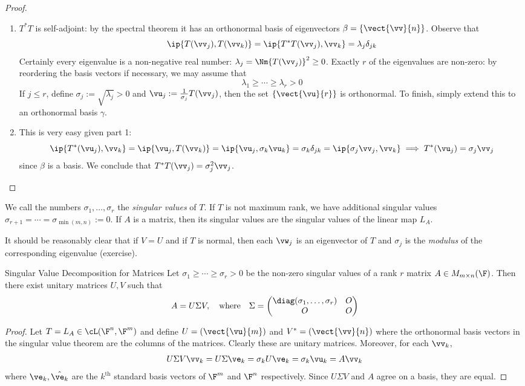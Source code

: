\begin{proof}
\begin{enumerate}
  \item $T^*T$ is self-adjoint: by the spectral theorem it has an orthonormal basis of eigenvectors $\beta=\{\vect{\vv}{n}\}$. Observe that
	\[\ip{T(\vv_j),T(\vv_k)}=\ip{T^*T(\vv_j),\vv_k}=\lambda_j\delta_{jk}\]
	Certainly every eigenvalue is a non-negative real number: $\lambda_j=\Nm{T(\vv_j)}^2\ge 0$. Exactly $r$ of the eigenvalues are non-zero: by reordering the basis vectors if necessary, we may assume that
	\[\lambda_1\ge\cdots\ge\lambda_r>0\]
	If $j\le r$, define $\sigma_j:=\sqrt{\lambda_j}>0$ and $\vu_j:=\frac 1{\sigma_j}T(\vv_j)$, then the set $\{\vect{\vu}{r}\}$ is orthonormal. To finish, simply extend this to an orthonormal basis $\gamma$.
	\item This is very easy given part 1:
	\[\ip{T^*(\vu_j),\vv_k}=\ip{\vu_j,T(\vv_k)}=\ip{\vu_j,\sigma_k\vu_k}=\sigma_k\delta_{jk} =\ip{\sigma_j\vv_j,\vv_k} \implies T^*(\vu_j)=\sigma_j\vv_j\]
	since $\beta$ is a basis. We conclude that $T^*T(\vv_j)=\sigma^2_j\vv_j$.\qedhere
\end{enumerate}
\end{proof}

\begin{defn}{}{}
We call the numbers $\sigma_1,\ldots,\sigma_r$ the \emph{singular values} of $T$. If $T$ is not maximum rank, we have additional singular values $\sigma_{r+1}=\cdots=\sigma_{\min(m,n)}:=0$. If $A$ is a matrix, then its singular values are the singular values of the linear map $L_A$.
\end{defn}

It should be reasonably clear that if $V=U$ and if $T$ is normal, then each $\vw_j$ is an eigenvector of $T$ and $\sigma_j$ is the \emph{modulus} of the corresponding eigenvalue (exercise).

\begin{cor}{Singular Value Decomposition for Matrices}{}
Let $\sigma_1\ge \cdots\ge \sigma_r>0$ be the non-zero singular values of a rank $r$ matrix $A\in M_{m\times n}(\F)$. Then there exist unitary matrices $U,V$ such that
\[A=U\Sigma V,\quad\text{where}\quad \Sigma=\begin{pmatrix}
\diag(\sigma_1,\ldots,\sigma_r)&O\\
O&O
\end{pmatrix}\]
\end{cor}

\begin{proof}
Let $T=L_A\in\cL(\F^n,\F^m)$ and define $U=(\vect{\vu}{m})$ and $V^*=(\vect{\vv}{n})$ where the orthonormal basis vectors in the singular value theorem are the columns of the matrices. Clearly these are unitary matrices. Moreover, for each $\vv_k$,
\[U\Sigma V\vv_k=U\Sigma\ve_k=\sigma_kU\ve_k=\sigma_k\vu_k=A\vv_k\]
where $\ve_k,\hat{\ve_k}$ are the $k^\text{th}$ standard basis vectors of $\F^m$ and $\F^n$ respectively. Since $U\Sigma V$ and $A$ agree on a basis, they are equal.
\end{proof}

